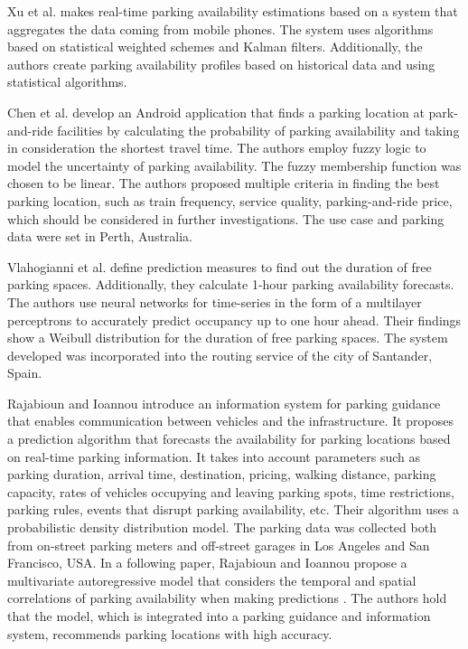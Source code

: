 	
Xu et al. \cite{xu} makes real-time parking availability estimations based on a system that aggregates the data coming from mobile phones. The system uses algorithms based on statistical weighted schemes and Kalman filters. Additionally, the authors create parking availability profiles based on historical data and using statistical algorithms.

Chen et al. \cite{zchen} develop an Android application that finds a parking location at park-and-ride facilities by calculating the probability of parking availability and taking in consideration the shortest travel time. The authors employ fuzzy logic to model the uncertainty of parking availability. The fuzzy membership function was chosen to be linear. The authors proposed multiple criteria in finding the best parking location, such as train frequency, service quality, parking-and-ride price, which should be considered in further investigations. The use case and parking data were set in Perth, Australia.

Vlahogianni et al. \cite{vlahogianni} define prediction measures to find out the duration of free parking spaces. Additionally, they calculate 1-hour parking availability forecasts. The authors use neural networks for time-series in the form of a multilayer perceptrons to accurately predict occupancy up to one hour ahead. Their findings show a Weibull distribution for the duration of free parking spaces. The system developed was incorporated into the routing service of the city of Santander, Spain.

Rajabioun and Ioannou \cite{rajabioun2013} introduce an information system for parking guidance that enables communication between vehicles and the infrastructure. It proposes a prediction algorithm that forecasts the availability for parking locations based on real-time parking information. It takes into account parameters such as parking duration, arrival time, destination, pricing, walking distance, parking capacity, rates of vehicles occupying and leaving parking spots, time restrictions, parking rules, events that disrupt parking availability, etc. Their algorithm uses a probabilistic density distribution model. The parking data was collected both from on-street parking meters and off-street garages in Los Angeles and San Francisco, USA. In a following paper, Rajabioun and Ioannou \cite{rajabioun2015} propose a multivariate autoregressive model that considers the temporal and spatial correlations of parking availability when making predictions
. The authors hold that the model, which is integrated into a parking guidance and information system, recommends parking locations with high accuracy. 

